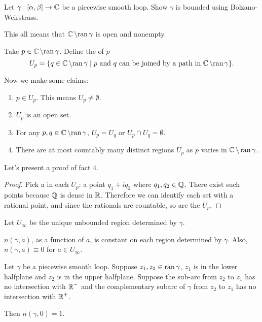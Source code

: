 \documentclass[notes]{subfile}
\begin{document}
\begin{exercise}
    Let $\gamma : [\alpha, \beta] \to \operatorname{\mathbb{C}}$ be a piecewise smooth loop.  Show $\gamma$ is bounded using Bolzano-Weirstrass.
\end{exercise}

\smallbreak
This all means that $\operatorname{\mathbb{C}} \setminus {\operatorname{ran}} \, \gamma$ is open and nonempty.

\begin{definition}
    Take $p \in \operatorname{\mathbb{C}} \setminus {\operatorname{ran}} \, \gamma$.
    Define the  of $p$
    \[ U_p = \{ q \in \operatorname{\mathbb{C}} \setminus {\operatorname{ran}} \, \gamma \; | \; 
    \text{$p$ and $q$ can be joined by a path in $\operatorname{\mathbb{C}} \setminus {\operatorname{ran}} \, \gamma$} \}. \]
\end{definition}
Now we make some claims:

\begin{enumerate}
    \item $p \in  U_p$.  This means $U_p \ne \emptyset$.

    \item $U_p$ is an open set.

    \item For any $p,q \in \operatorname{\mathbb{C}} \setminus {\operatorname{ran}} \, \gamma$, $U_p = U_q$ or $U_p \cap U_q = \emptyset$.

    \item There are at most countably many distinct regions $U_p$ as $p$ varies in $\operatorname{\mathbb{C}} \setminus \operatorname{ran}{\gamma}$.
\end{enumerate}

Let's present a proof of fact $4$.

\begin{proof}
    Pick a  in each $U_p$: a point $q_1 + iq_2$ where $q_1, q_2 \in \operatorname{\mathbb{Q}}$.
    There exist such points because $\operatorname{\mathbb{Q}}$ is dense in $\operatorname{\mathbb{R}}$.
    Therefore we can identify each set with a rational point, and since the rationals are countable, so are the $U_p$.
\end{proof}

Let $U_{\infty}$ be the unique unbounded region determined by $\gamma$.

\begin{theorem}
    $n(\gamma, a)$, as a function of $a$, is constant on each region determined by $\gamma$.
    Also, $n(\gamma, a) \equiv 0$ for $a \in U_{\infty}$. 
\end{theorem}

\begin{theorem}
    Let $\gamma$ be a piecewise smooth loop.
    Suppose $z_1, z_2 \in \operatorname{ran}{\gamma}$, $z_1$ is in the lower halfplane and $z_2$ is in the upper halfplane.
    Suppose the sub-arc from $z_2$ to $z_1$ has no intersection with $\operatorname{\mathbb{R}}^-$ and the complementary subarc of $\gamma$ from $z_2$ to $z_1$ has no intersection with $\operatorname{\mathbb{R}}^+$.

    \noindent
    Then $n(\gamma, 0) = 1$.
\end{theorem}
\end{document}
